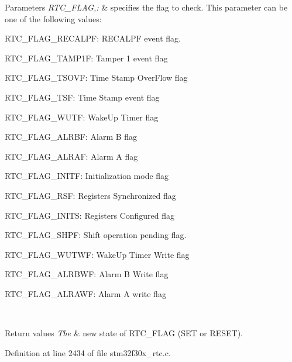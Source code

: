 \begin{DoxyParams}{Parameters}
{\em R\-T\-C\-\_\-\-F\-L\-A\-G,\-:} & specifies the flag to check. This parameter can be one of the following values\-: \begin{DoxyItemize}
\item R\-T\-C\-\_\-\-F\-L\-A\-G\-\_\-\-R\-E\-C\-A\-L\-P\-F\-: R\-E\-C\-A\-L\-P\-F event flag. \item R\-T\-C\-\_\-\-F\-L\-A\-G\-\_\-\-T\-A\-M\-P1\-F\-: Tamper 1 event flag \item R\-T\-C\-\_\-\-F\-L\-A\-G\-\_\-\-T\-S\-O\-V\-F\-: Time Stamp Over\-Flow flag \item R\-T\-C\-\_\-\-F\-L\-A\-G\-\_\-\-T\-S\-F\-: Time Stamp event flag \item R\-T\-C\-\_\-\-F\-L\-A\-G\-\_\-\-W\-U\-T\-F\-: Wake\-Up Timer flag \item R\-T\-C\-\_\-\-F\-L\-A\-G\-\_\-\-A\-L\-R\-B\-F\-: Alarm B flag \item R\-T\-C\-\_\-\-F\-L\-A\-G\-\_\-\-A\-L\-R\-A\-F\-: Alarm A flag \item R\-T\-C\-\_\-\-F\-L\-A\-G\-\_\-\-I\-N\-I\-T\-F\-: Initialization mode flag \item R\-T\-C\-\_\-\-F\-L\-A\-G\-\_\-\-R\-S\-F\-: Registers Synchronized flag \item R\-T\-C\-\_\-\-F\-L\-A\-G\-\_\-\-I\-N\-I\-T\-S\-: Registers Configured flag \item R\-T\-C\-\_\-\-F\-L\-A\-G\-\_\-\-S\-H\-P\-F\-: Shift operation pending flag. \item R\-T\-C\-\_\-\-F\-L\-A\-G\-\_\-\-W\-U\-T\-W\-F\-: Wake\-Up Timer Write flag \item R\-T\-C\-\_\-\-F\-L\-A\-G\-\_\-\-A\-L\-R\-B\-W\-F\-: Alarm B Write flag \item R\-T\-C\-\_\-\-F\-L\-A\-G\-\_\-\-A\-L\-R\-A\-W\-F\-: Alarm A write flag \end{DoxyItemize}
\\
\hline
\end{DoxyParams}

\begin{DoxyRetVals}{Return values}
{\em The} & new state of R\-T\-C\-\_\-\-F\-L\-A\-G (S\-E\-T or R\-E\-S\-E\-T). \\
\hline
\end{DoxyRetVals}


Definition at line 2434 of file stm32f30x\-\_\-rtc.\-c.

